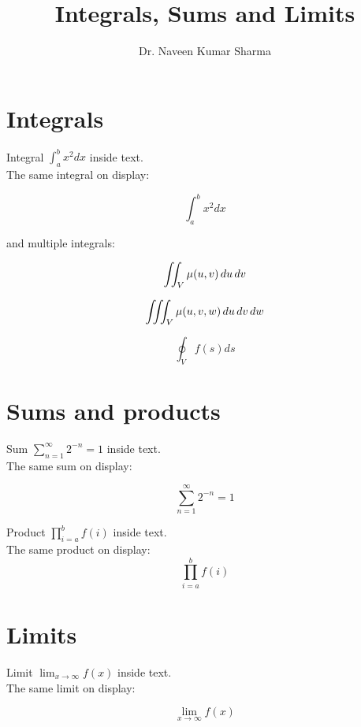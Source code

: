 \documentclass[10pt,a4 paper]{article}
\title{\Large\textbf{Integrals, Sums and Limits}}
\author{Dr. Naveen Kumar Sharma}
\begin{document}
\maketitle
\section{Integrals}
Integral $\int_{a}^{b}x^{2}dx$ inside text.\\ \hspace*{0.3cm}The same integral on display:

\begin{center}
\[\int_{a}^{b}x^{2}dx\]
\end{center}

and multiple integrals:

$$\iint_V\mu(u,v)\,du\,dv\\$$

$$\iiint_V\mu(u,v,w)\,du\,dv\,dw\\$$

$$\oint_{V}f(s)ds$$


\section{Sums and products}
Sum $\sum_{n=1}^{\infty}2^{-n}=1$ inside text.\\ \hspace*{0.3cm}The same sum on display:

$$\sum_{n=1}^{\infty}2^{-n}=1$$

Product $\prod_{i=a}^{b}f(i)$ inside text.\\ The same product on display: 
$$\prod_{i=a}^{b}f(i)$$

\section{Limits}
Limit $\lim_{x\to\infty}f(x)$ inside text.\\ \hspace*{0.3cm}The same limit on display:


$$\lim_{x\rightarrow\infty}f(x)$$
\end{document}

